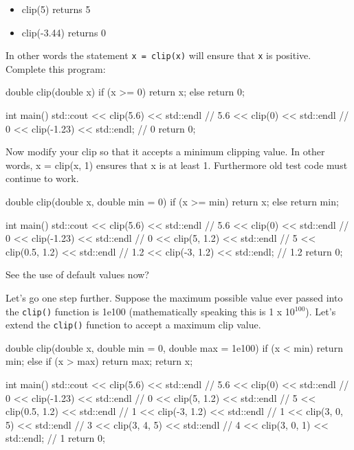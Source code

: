 \begin{itemize}
\item clip(5) returns 5
\item clip(-3.44) returns 0
\end{itemize}

In other words the statement \texttt{x = clip(x)} will ensure that
\texttt{x} is positive. Complete this program:

\begin{consolethree}[escapeinside=||]
double clip(double x)
{
    if (x >= 0)
        return x;
    else
        return 0;
}

int main()
{
    std::cout << clip(5.6) << std::endl   // 5.6
              << clip(0) << std::endl     // 0
              << clip(-1.23) << std::endl; // 0
    return 0;
}
\end{consolethree}

Now modify your clip so that it accepts a minimum clipping value. In other words, x = clip(x, 1) ensures that x is at least 1. Furthermore old test code must continue to work.

\begin{consolethree}[escapeinside=||]
double clip(double x, double min = 0)
{
    if (x >= min)
        return x;
    else
        return min;
}

int main()
{
    std::cout << clip(5.6) << std::endl      // 5.6
              << clip(0) << std::endl        // 0
              << clip(-1.23) << std::endl    // 0
              << clip(5, 1.2) << std::endl   // 5
              << clip(0.5, 1.2) << std::endl // 1.2
              << clip(-3, 1.2) << std::endl; // 1.2
    return 0;
}
\end{consolethree}

See the use of default values now?

Let's go one step further. Suppose the maximum possible value ever passed into the \texttt{clip()} function is 1e100 (mathematically speaking this is 1 x 10$^{100}$). Let's extend the \texttt{clip()} function to accept a maximum clip value.

\begin{consolethree}[escapeinside=||]
double clip(double x,
            double min = 0, double max = 1e100)
{
    if (x < min)
        return min;
    else if (x > max)
        return max;
    return x;
}

int main()
{
    std::cout << clip(5.6) << std::endl      // 5.6
              << clip(0) << std::endl        // 0
              << clip(-1.23) << std::endl    // 0
              << clip(5, 1.2) << std::endl   // 5
              << clip(0.5, 1.2) << std::endl // 1
              << clip(-3, 1.2) << std::endl  // 1
              << clip(3, 0, 5) << std::endl  // 3
              << clip(3, 4, 5) << std::endl  // 4
              << clip(3, 0, 1) << std::endl; // 1
    return 0;
}
\end{consolethree}

